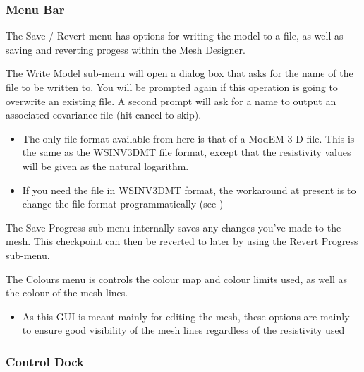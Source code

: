\documentclass[letterpaper,10pt,english]{sphinxmanual}
\begin{document}
\subsubsection{Menu Bar}
\label{\detokenize{content/mesh_designer/main_window:menu-bar}}
\begin{figure}[htbp]
\centering

\noindent{}
\end{figure}

The Save / Revert menu has options for writing the model to a file, as well as saving and reverting progess within the Mesh Designer.

The Write Model sub-menu will open a dialog box that asks for the name of the file to be written to. You will be prompted again if this operation is going to overwrite an existing file. A second prompt will ask for a name to output an associated covariance file (hit cancel to skip).
\begin{itemize}
\item {} 
The only file format available from here is that of a ModEM 3-D file. This is the same as the WSINV3DMT file format, except that the resistivity values will be given as the natural logarithm.

\item {} 
If you need the file in WSINV3DMT format, the workaround at present is to change the file format programmatically (see {\hyperref[\detokenize{content/examples/recipes:recipes}]{}})

\end{itemize}

The Save Progress sub-menu internally saves any changes you’ve made to the mesh. This checkpoint can then be reverted to later by using the Revert Progress sub-menu.

The Colours menu is controls the colour map and colour limits used, as well as the colour of the mesh lines.
\begin{itemize}
\item {} 
As this GUI is meant mainly for editing the mesh, these options are mainly to ensure good visibility of the mesh lines regardless of the resistivity used

\end{itemize}


\subsubsection{Control Dock}
\label{\detokenize{content/mesh_designer/main_window:control-dock}}
\begin{figure}[htbp]
\centering

\noindent{}
\end{figure}
\end{document}

